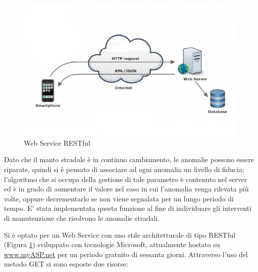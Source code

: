 \documentclass[a4paper, 11pt]{article} %
\begin{document}
\begin{figure}[h]
	\begin{center}
		\includegraphics[width=\textwidth]{images/rest.jpg}
	\end{center}
	\caption{Web Service RESTful}
	\label{fig:rest}
\end{figure}

 Dato che il manto stradale è in continuo cambiamento, le anomalie possono essere riparate, quindi si è pensato di associare ad ogni anomalia un livello di fiducia; l'algoritmo che si occupa della gestione di tale parametro è contenuto nel server ed è in grado di aumentare il valore nel caso in cui l'anomalia venga rilevata più volte, oppure decrementarlo se non viene segnalata per un lungo periodo di tempo. E' stata implementata questa funzione al fine di individuare gli interventi di manutenzione che risolvono le anomalie stradali.

Si è optato per un Web Service con uno stile architetturale di tipo RESTful (Figura \ref{fig:rest}) sviluppato con tecnologie Microsoft, attualmente hostato su \url{www.myASP.net} per un periodo gratuito di sessanta giorni. 
Attraverso l'uso del metodo GET si sono esposte due risorse:
\end{document}
